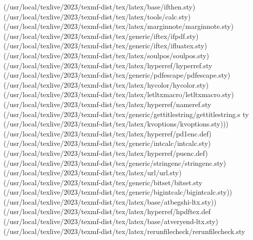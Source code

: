 (/usr/local/texlive/2023/texmf-dist/tex/latex/base/ifthen.sty)
(/usr/local/texlive/2023/texmf-dist/tex/latex/tools/calc.sty)
(/usr/local/texlive/2023/texmf-dist/tex/latex/marginnote/marginnote.sty)
(/usr/local/texlive/2023/texmf-dist/tex/generic/iftex/ifpdf.sty)
(/usr/local/texlive/2023/texmf-dist/tex/generic/iftex/ifluatex.sty)
(/usr/local/texlive/2023/texmf-dist/tex/latex/soulpos/soulpos.sty)
(/usr/local/texlive/2023/texmf-dist/tex/latex/hyperref/hyperref.sty
(/usr/local/texlive/2023/texmf-dist/tex/generic/pdfescape/pdfescape.sty)
(/usr/local/texlive/2023/texmf-dist/tex/latex/hycolor/hycolor.sty)
(/usr/local/texlive/2023/texmf-dist/tex/latex/letltxmacro/letltxmacro.sty)
(/usr/local/texlive/2023/texmf-dist/tex/latex/hyperref/nameref.sty
(/usr/local/texlive/2023/texmf-dist/tex/generic/gettitlestring/gettitlestring.s
ty (/usr/local/texlive/2023/texmf-dist/tex/latex/kvoptions/kvoptions.sty)))
(/usr/local/texlive/2023/texmf-dist/tex/latex/hyperref/pd1enc.def)
(/usr/local/texlive/2023/texmf-dist/tex/generic/intcalc/intcalc.sty)
(/usr/local/texlive/2023/texmf-dist/tex/latex/hyperref/puenc.def)
(/usr/local/texlive/2023/texmf-dist/tex/generic/stringenc/stringenc.sty)
(/usr/local/texlive/2023/texmf-dist/tex/latex/url/url.sty)
(/usr/local/texlive/2023/texmf-dist/tex/generic/bitset/bitset.sty
(/usr/local/texlive/2023/texmf-dist/tex/generic/bigintcalc/bigintcalc.sty))
(/usr/local/texlive/2023/texmf-dist/tex/latex/base/atbegshi-ltx.sty))
(/usr/local/texlive/2023/texmf-dist/tex/latex/hyperref/hpdftex.def
(/usr/local/texlive/2023/texmf-dist/tex/latex/base/atveryend-ltx.sty)
(/usr/local/texlive/2023/texmf-dist/tex/latex/rerunfilecheck/rerunfilecheck.sty

